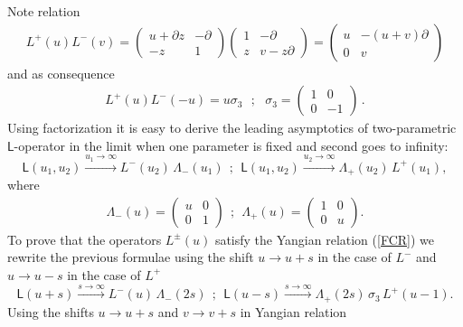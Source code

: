 \documentclass[11pt]{article}
\numberwithin{equation}{section}
\theoremstyle{plain}
\theoremstyle{definition}
\def\dd{\partial}
\begin{document}
Note relation 
\begin{align}\label{Lpm}
	L^+(u)L^-(v) = \left(\begin{array}{cc}
		u + \dd z & -\dd \\
		-z& 1\end{array}\right)\left(\begin{array}{cc}
		1 & -\dd \\
		z& v-z\dd\end{array}\right) = \left(\begin{array}{cc}
		u  & -(u+v)\dd \\
		0& v\end{array}\right)  
\end{align} 
and as consequence
\begin{align}\label{Lpm-2}
	L^+(u)L^-(-u) = u \sigma_3 \ \ \ ;\ \ \ 
	\sigma_3 = \left(\begin{array}{cc} 
		1 & 0 \\
		0 & -1\end{array}\right)\,.
\end{align}
Using factorization it is easy to derive the leading asymptotics of 
two-parametric $\mathsf{L}$-operator in the limit when one 
parameter is fixed and second goes to infinity:  
\begin{equation} \label{asymptL}
	\mathsf{L}(u_1,u_2) \xrightarrow{u_{1}\to\infty}
	L^{-}(u_2)\,\Lambda_{-}(u_1) \ \ ;\ \ \mathsf{L}(u_1,u_2)
	\xrightarrow{u_{2}\to\infty} 
	\Lambda_{+}(u_2)\, L^{+}(u_1),
\end{equation}
where 
\begin{align}
	\Lambda_{-}(u) = \left(\begin{array}{cc}
		u & 0 \\
		0 & 1\end{array}\right)  \ \ ; \ \ 
	\Lambda_{+}(u) = \left(\begin{array}{cc}
		1 & 0 \\
		0 & u\end{array}\right).
\end{align}
To prove that the operators $L^{\pm}(u)$ satisfy the Yangian relation
(\ref{FCR}) we rewrite the previous formulae using the shift 
$u \to u+s$ in the case of $L^{-}$ and $u \to u-s$ in the 
case of $L^{+}$
\begin{equation} \label{asymptL1}
	\mathsf{L}(u+s) \xrightarrow{s\to\infty}
	L^{-}(u)\,\Lambda_{-}(2s)\ \ ;\ \ \mathsf{L}(u-s)
	\xrightarrow{s\to\infty} 
	\Lambda_{+}(2s)\,\sigma_3\, L^{+}(u-1).
\end{equation}
Using the shifts $u \to u+s$ and $v\to v+s$ in Yangian relation 
\end{document}
